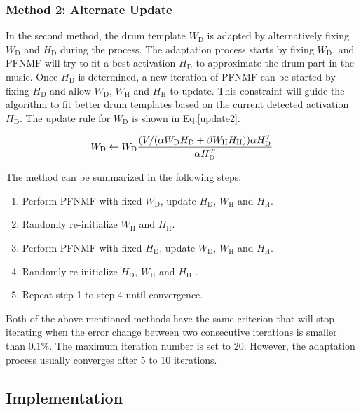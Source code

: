 \documentclass{article}
\begin{document}
\subsubsection{Method 2: Alternate Update}\label{subsubsec:method2}
In the second method, the drum template $W_\mathrm{D}$ is adapted by alternatively fixing $W_\mathrm{D}$ and $H_\mathrm{D}$ during the process. The adaptation process starts by fixing $W_\mathrm{D}$, and PFNMF will try to fit a best activation $H_\mathrm{D}$ to approximate the drum part in the music. Once $H_\mathrm{D}$ is determined, a new iteration of PFNMF can be started by fixing $H_\mathrm{D}$ and allow $W_\mathrm{D}$, $W_\mathrm{H}$ and $H_\mathrm{H}$ to update. This constraint will guide the algorithm to fit better drum templates based on the current detected activation $H_\mathrm{D}$. The update rule for $W_\mathrm{D}$ is shown in Eq.\eqref{update2}. 

\begin{equation}\label{update2}
W_\mathrm{D} \leftarrow W_\mathrm{D}\frac{(V/(\alpha W_\mathrm{D}H_\mathrm{D} + \beta W_\mathrm{H}H_\mathrm{H})) \alpha H_\mathrm{D}^T}{\alpha H_\mathrm{D}^T}\\
\end{equation}

The method can be summarized in the following steps:
\begin{enumerate}
    \item   Perform PFNMF with fixed $W_\mathrm{D}$, update $H_\mathrm{D}$, $W_\mathrm{H}$ and $H_\mathrm{H}$. 
    \item   Randomly re-initialize $W_\mathrm{H}$ and $H_\mathrm{H}$.
    \item   Perform PFNMF with fixed $H_\mathrm{D}$, update $W_\mathrm{D}$, $W_\mathrm{H}$ and $H_\mathrm{H}$.
    \item   Randomly re-initialize $H_\mathrm{D}$, $W_\mathrm{H}$ and $H_\mathrm{H}$ .
    \item   Repeat step 1 to step 4 until convergence. 
\end{enumerate}

Both of the above mentioned methods have the same criterion that will stop iterating when the error change between two consecutive iterations is smaller than $0.1\%$. The maximum iteration number is set to 20. However, the adaptation process usually converges after 5 to 10 iterations. 

\subsection{Implementation}\label{subsec:processing steps}
\end{document}
